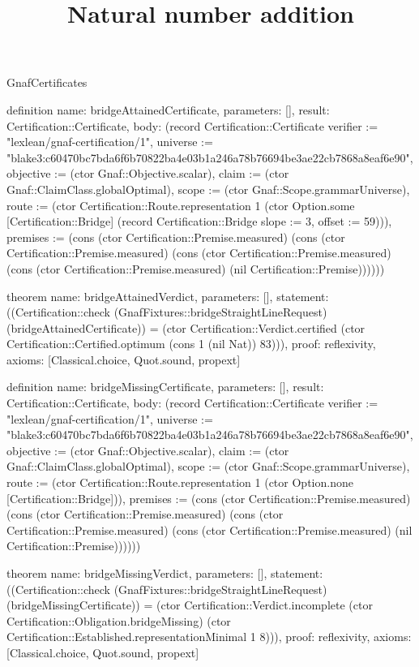 \begin{lexlean}{GnafCertificates}
\title{Natural number addition}
\begin{semanticmodule}
definition{
  name: bridgeAttainedCertificate,
  parameters: [],
  result: Certification::Certificate,
  body: (record Certification::Certificate {verifier := "lexlean/gnaf-certification/1", universe := "blake3:c60470bc7bda6f6b70822ba4e03b1a246a78b76694be3ae22cb7868a8eaf6e90", objective := (ctor Gnaf::Objective.scalar), claim := (ctor Gnaf::ClaimClass.globalOptimal), scope := (ctor Gnaf::Scope.grammarUniverse), route := (ctor Certification::Route.representation 1 (ctor Option.some [Certification::Bridge] (record Certification::Bridge {slope := 3, offset := 59}))), premises := (cons (ctor Certification::Premise.measured) (cons (ctor Certification::Premise.measured) (cons (ctor Certification::Premise.measured) (cons (ctor Certification::Premise.measured) (nil Certification::Premise)))))})
}

theorem{
  name: bridgeAttainedVerdict,
  parameters: [],
  statement: ((Certification::check (GnafFixtures::bridgeStraightLineRequest) (bridgeAttainedCertificate)) = (ctor Certification::Verdict.certified (ctor Certification::Certified.optimum (cons 1 (nil Nat)) 83))),
  proof: reflexivity{},
  axioms: [Classical.choice, Quot.sound, propext]
}

definition{
  name: bridgeMissingCertificate,
  parameters: [],
  result: Certification::Certificate,
  body: (record Certification::Certificate {verifier := "lexlean/gnaf-certification/1", universe := "blake3:c60470bc7bda6f6b70822ba4e03b1a246a78b76694be3ae22cb7868a8eaf6e90", objective := (ctor Gnaf::Objective.scalar), claim := (ctor Gnaf::ClaimClass.globalOptimal), scope := (ctor Gnaf::Scope.grammarUniverse), route := (ctor Certification::Route.representation 1 (ctor Option.none [Certification::Bridge])), premises := (cons (ctor Certification::Premise.measured) (cons (ctor Certification::Premise.measured) (cons (ctor Certification::Premise.measured) (cons (ctor Certification::Premise.measured) (nil Certification::Premise)))))})
}

theorem{
  name: bridgeMissingVerdict,
  parameters: [],
  statement: ((Certification::check (GnafFixtures::bridgeStraightLineRequest) (bridgeMissingCertificate)) = (ctor Certification::Verdict.incomplete (ctor Certification::Obligation.bridgeMissing) (ctor Certification::Established.representationMinimal 1 8))),
  proof: reflexivity{},
  axioms: [Classical.choice, Quot.sound, propext]
}


\end{semanticmodule}
\end{lexlean}
